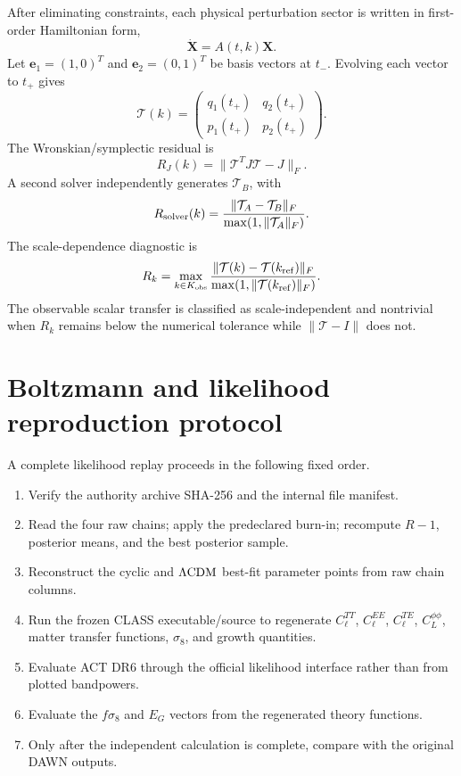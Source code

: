 \documentclass[12pt]{iopart}
\newcommand{\LCDM}{\Lambda{\rm CDM}}
\newcommand{\cT}{\mathcal T}
\begin{document}
After eliminating constraints, each physical perturbation sector is written in first-order Hamiltonian form,
\begin{equation}
\dot{\bm X}=A(t,k)\bm X.
\end{equation}
Let $\bm e_1=(1,0)^T$ and $\bm e_2=(0,1)^T$ be basis vectors at $t_-$.  Evolving each vector to $t_+$ gives
\begin{equation}
\cT(k)=\left(\begin{array}{cc}
q_1(t_+) & q_2(t_+)\\
p_1(t_+) & p_2(t_+)
\end{array}\right).
\end{equation}
The Wronskian/symplectic residual is
\begin{equation}
R_J(k)=\|\cT^TJ\cT-J\|_F.
\end{equation}
A second solver independently generates $\cT_B$, with
\begin{equation}
R_{\rm solver}(k)=\frac{\|\cT_A-\cT_B\|_F}{\max(1,\|\cT_A\|_F)}.
\end{equation}
The scale-dependence diagnostic is
\begin{equation}
R_k=\max_{k\in K_{\rm obs}}\frac{\|\cT(k)-\cT(k_{\rm ref})\|_F}
{\max(1,\|\cT(k_{\rm ref})\|_F)}.
\end{equation}
The observable scalar transfer is classified as scale-independent and nontrivial when $R_k$ remains below the numerical tolerance while $\|\cT-I\|$ does not.

\section{Boltzmann and likelihood reproduction protocol}
\label{app:likelihood}

A complete likelihood replay proceeds in the following fixed order.
\begin{enumerate}
\item Verify the authority archive SHA-256 and the internal file manifest.
\item Read the four raw chains; apply the predeclared burn-in; recompute $R-1$, posterior means, and the best posterior sample.
\item Reconstruct the cyclic and $\LCDM$ best-fit parameter points from raw chain columns.
\item Run the frozen CLASS executable/source to regenerate $C_\ell^{TT}$, $C_\ell^{EE}$, $C_\ell^{TE}$, $C_L^{\phi\phi}$, matter transfer functions, $\sigma_8$, and growth quantities.
\item Evaluate ACT DR6 through the official likelihood interface rather than from plotted bandpowers.
\item Evaluate the $f\sigma_8$ and $E_G$ vectors from the regenerated theory functions.
\item Only after the independent calculation is complete, compare with the original DAWN outputs.
\end{enumerate}
\end{document}
